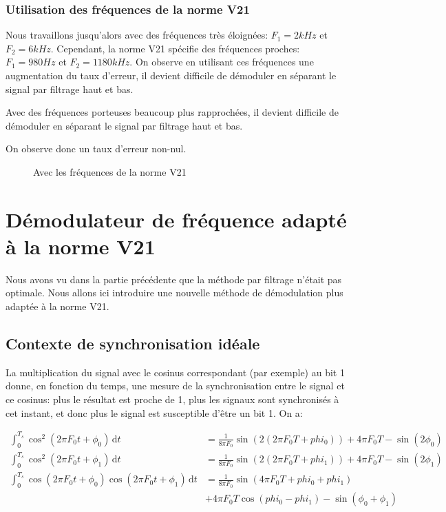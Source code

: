 \documentclass{article}
\begin{document}
\subsubsection{Utilisation des fréquences de la norme V21}

Nous travaillons jusqu'alors avec des fréquences très éloignées: $F_1=2kHz$ et $F_2=6kHz$. Cependant, la norme V21 spécifie des fréquences proches: $F_1=980Hz$ et $F_2=1180kHz$. On observe en utilisant ces fréquences une augmentation du taux d'erreur, il devient difficile de démoduler en séparant le signal par filtrage haut et bas.

Avec des fréquences porteuses beaucoup plus rapprochées, il devient difficile de démoduler en séparant le signal par filtrage haut et bas.

On observe donc un taux d'erreur non-nul.

\begin{figure}[H]
	\centering
	
	\caption{Avec les fréquences de la norme V21}
	\label{fig:filtrage-avec-v21}
\end{figure}

\section{Démodulateur de fréquence adapté à la norme V21}

Nous avons vu dans la partie précédente que la méthode par filtrage n'était pas optimale. Nous allons ici introduire une nouvelle méthode de démodulation plus adaptée à la norme V21.

\subsection{Contexte de synchronisation idéale}
\label{synchro-ideale}


La multiplication du signal avec le cosinus correspondant (par exemple) au bit 1 donne, en fonction du temps, une mesure de la synchronisation entre le signal et ce cosinus: plus le résultat est proche de 1, plus les signaux sont synchronisés à cet instant, et donc plus le signal est susceptible d'être un bit 1.
On a:

\begin{align*}
	\int_{0}^{T_s} \cos^2(2 \pi F_0 t + \phi_0) \, \mathrm{d}t  &= \frac{1} {8 \pi F_0} \sin(2(2 \pi F_0 T + phi_0))+4 \pi F_0 T - \sin(2 \phi_0) \\
	\int_{0}^{T_s} \cos^2(2 \pi F_0 t + \phi_1) \, \mathrm{d}t  &= \frac{1} {8 \pi F_0} \sin(2(2 \pi F_0 T + phi_1))+4 \pi F_0 T - \sin(2 \phi_1) \\
	\int_{0}^{T_s} \cos(2 \pi F_0 t + \phi_0) \cos(2 \pi F_0 t + \phi_1)\, \mathrm{d}t  &= \frac{1} {8 \pi F_0} \sin(4 \pi F_0 T + phi_0 + phi_1)\\
											    & + 4 \pi F_0 T \cos(phi_0 - phi_1) - \sin (\phi_0 + \phi_1) 
\end{align*}
\end{document}

